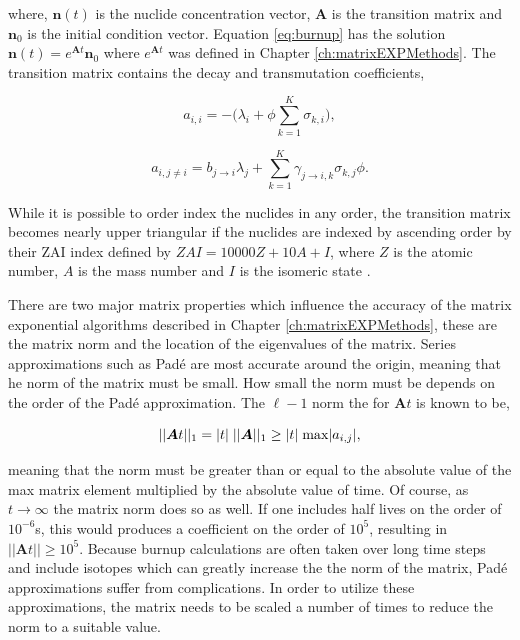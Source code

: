 \noindent where, $\boldsymbol{n}(t)$ is the nuclide concentration vector, $\boldsymbol{A}$ is the transition matrix and $\boldsymbol{n}_{0}$ is the initial condition vector. Equation \ref{eq:burnup} has the solution $\boldsymbol{n}(t) = e^{\boldsymbol{A}t}\boldsymbol{n}_{0}$ where $e^{\boldsymbol{A}t}$ was defined in Chapter \ref{ch:matrixEXPMethods}. The transition matrix contains the decay and transmutation coefficients, 

\begin{equation}
    a_{i,i} = -\bigg(\lambda_{i} + \phi\sum_{k=1}^{K} \sigma_{k,i}\bigg),
    \label{eq:diagonalCoeffsTraditionalBurnup}
\end{equation}

\begin{equation}
    a_{i,j\neq i} = b_{j\rightarrow i}\lambda_{j} + 
    \sum_{k=1}^{K}\gamma_{j\rightarrow i,k}\sigma_{k,j}\phi.
    \label{eq:offdiagonalCoeffsTraditionalBurnup}
\end{equation}

\noindent While it is possible to order index the nuclides in any order, the transition matrix becomes nearly upper triangular if the nuclides are indexed by ascending order by their ZAI index defined by $ZAI = 10000Z + 10A + I$, where $Z$ is the atomic number, $A$ is the mass number and $I$ is the isomeric state \cite{pusa2013}.

There are two major matrix properties which influence the accuracy of the matrix exponential algorithms described in Chapter \ref{ch:matrixEXPMethods}, these are the matrix norm and the location of the eigenvalues of the matrix. Series approximations such as Pad\'e are most accurate around the origin, meaning that he norm of the matrix must be small. How small the norm must be depends on the order of the Pad\'e approximation. The $\ell-1$ norm the for $\boldsymbol{A}t$ is known to be,

\begin{equation}
    ||\boldsymbol{A}t||_{1} = |t|\hspace{1mm}||\boldsymbol{A}||_{1} \geq |t|\hspace{1mm}\text{max}|a_{i,j}|, 
\end{equation}

\noindent meaning that the norm must be greater than or equal to the absolute value of the max matrix element multiplied by the absolute value of time. Of course, as $t \rightarrow \infty$ the matrix norm does so as well. If one includes half lives on the order of $10^{-6}$s, this would produces a coefficient on the order of $10^{5}$, resulting in $||\boldsymbol{A}t|| \geq 10^{5}$. Because burnup calculations are often taken over long time steps and include isotopes which can greatly increase the the norm of the matrix, Pad\'e approximations suffer from complications. In order to utilize these approximations, the matrix needs to be scaled a number of times to reduce the norm to a suitable value. 

